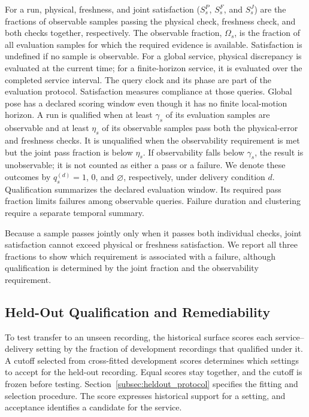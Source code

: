 \documentclass[journal]{IEEEtran}
\newcommand{\rev}[1]{#1}
\newcommand{\newrev}[1]{{#1}}
\begin{document}
For a run, physical, freshness, and joint satisfaction
($S_s^P$, $S_s^F$, and $S_s^J$) are the fractions of observable samples
passing the physical check, freshness check, and both checks together,
respectively. The observable fraction, $\Omega_s$, is the fraction of
all evaluation samples for which the required evidence is available.
Satisfaction is undefined if no sample is observable. For a global
service, physical discrepancy is evaluated at the current time; for a
finite-horizon service, it is evaluated over the completed service
interval.
\rev{The query clock and its phase are part of the evaluation protocol.
Satisfaction measures compliance at those queries. Global pose has a
declared scoring window even though it has no finite local-motion
horizon.}
A run is qualified when at least $\gamma_s$ of its evaluation samples
are observable and at least $\eta_s$ of its observable samples pass
both the physical-error and freshness checks. It is unqualified when
the observability requirement is met but the joint pass fraction is
below $\eta_s$. If observability falls below $\gamma_s$, the result is
unobservable; it is not counted as either a pass or a failure.
We denote these outcomes by $q_s^{(d)}=1$, $0$, and $\varnothing$,
respectively, under delivery condition $d$.
\newrev{Qualification summarizes the declared evaluation window. Its
required pass fraction limits failures among observable queries.
Failure duration and clustering require a separate temporal summary.}

Because a sample passes jointly only when it passes both individual
checks, joint satisfaction cannot exceed physical or freshness
satisfaction. We report all three fractions to show which requirement
is associated with a failure, although qualification is determined by
the joint fraction and the observability requirement.

\subsection{Held-Out Qualification and Remediability}
\label{subsec:qualification_remediability}
To test transfer to an unseen recording, the historical surface scores
each service--delivery setting by the fraction of development recordings
that qualified under it. A cutoff selected from cross-fitted development
scores determines which settings to accept for the held-out recording.
Equal scores stay together, and the cutoff is frozen before testing.
Section~\ref{subsec:heldout_protocol} specifies the fitting and selection
procedure. The score expresses historical support for a setting, and
acceptance identifies a candidate for the service.
\end{document}
